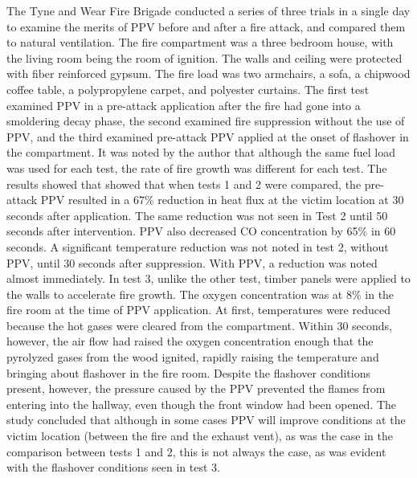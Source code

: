 \documentclass{article}
\begin{document}
\begin{appendices}
The Tyne and Wear Fire Brigade conducted a series of three trials in a single day to examine the merits of PPV before and after a fire attack, and compared them to natural ventilation. The fire compartment was a three bedroom house, with the living room being the room of ignition. The walls and ceiling were protected with fiber reinforced gypsum. The fire load was two armchairs, a sofa, a chipwood coffee table, a polypropylene carpet, and polyester curtains. The first test examined PPV in a pre-attack application after the fire had gone into a smoldering decay phase, the second examined fire suppression without the use of PPV, and the third examined pre-attack PPV applied at the onset of flashover in the compartment. It was noted by the author that although the same fuel load was used for each test, the rate of fire growth was different for each test. The results showed that showed that when tests 1 and 2 were compared, the pre-attack PPV resulted in a 67\% reduction in heat flux at the victim location at 30 seconds after application. The same reduction was not seen in Test 2 until 50 seconds after intervention. PPV also decreased CO concentration by 65\% in 60 seconds. A significant temperature reduction was not noted in test 2, without PPV, until 30 seconds after suppression. With PPV, a reduction was noted almost immediately. In test 3, unlike the other test, timber panels were applied to the walls to accelerate fire growth. The oxygen concentration was at 8\% in the fire room at the time of PPV application. At first, temperatures were reduced because the hot gases were cleared from the compartment. Within 30 seconds, however, the air flow had raised the oxygen concentration enough that the pyrolyzed gases from the wood ignited, rapidly raising the temperature and bringing about flashover in the fire room. Despite the flashover conditions present, however, the pressure caused by the PPV prevented the flames from entering into the hallway, even though the front window had been opened. The study concluded that although in some cases PPV will improve conditions at the victim location (between the fire and the exhaust vent), as was the case in the comparison between tests 1 and 2, this is not always the case, as was evident with the flashover conditions seen in test 3.\cite{TyneAndWearauthorless}
	

\end{appendices}
\end{document}
